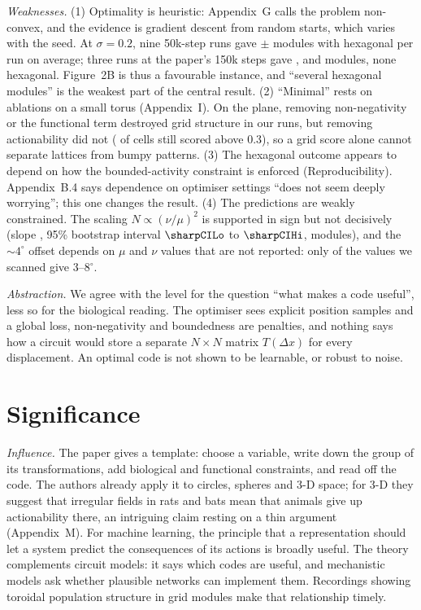 \documentclass[10pt,letterpaper]{article}
\begin{document}
\emph{Weaknesses.} (1) Optimality is heuristic: Appendix~G calls the problem non-convex, and the evidence is gradient descent from random starts, which varies with the seed. At $\sigma=0.2$, nine 50k-step runs gave \baseModules{}$\pm$\baseModulesSd{} modules with \baseHex{} hexagonal per run on average; three runs at the paper's 150k steps gave \mainLowModulesA, \mainLowModulesB{} and \mainLowModulesC{} modules, none hexagonal. Figure~2B is thus a favourable instance, and ``several hexagonal modules'' is the weakest part of the central result. (2) ``Minimal'' rests on ablations on a small torus (Appendix~I). On the plane, removing non-negativity or the functional term destroyed grid structure in our runs, but removing actionability did not (\ablNoActGrid{} of cells still scored above 0.3), so a grid score alone cannot separate lattices from bumpy patterns. (3) The hexagonal outcome appears to depend on how the bounded-activity constraint is enforced (Reproducibility). Appendix~B.4 says dependence on optimiser settings ``does not seem deeply worrying''; this one changes the result. (4) The predictions are weakly constrained. The scaling $N\propto(\nu/\mu)^2$ is supported in sign but not decisively (slope \sharpSlope, 95\% bootstrap interval $\sharpCILo$ to $\sharpCIHi$, \sharpNMod{} modules), and the $\sim4^\circ$ offset depends on $\mu$ and $\nu$ values that are not reported: only \angleBandFrac{} of the values we scanned give 3--8$^\circ$.

\emph{Abstraction.} We agree with the level for the question ``what makes a code useful'', less so for the biological reading. The optimiser sees explicit position samples and a global loss, non-negativity and boundedness are penalties, and nothing says how a circuit would store a separate $N\times N$ matrix $T(\Delta x)$ for every displacement. An optimal code is not shown to be learnable, or robust to noise.

\section{Significance}
\emph{Influence.} The paper gives a template: choose a variable, write down the group of its transformations, add biological and functional constraints, and read off the code. The authors already apply it to circles, spheres and 3-D space; for 3-D they suggest that irregular fields in rats and bats mean that animals give up actionability there, an intriguing claim resting on a thin argument (Appendix~M). For machine learning, the principle that a representation should let a system predict the consequences of its actions is broadly useful. The theory complements circuit models: it says which codes are useful, and mechanistic models ask whether plausible networks can implement them. Recordings showing toroidal population structure in grid modules \citep{gardner2022} make that relationship timely.
\end{document}

